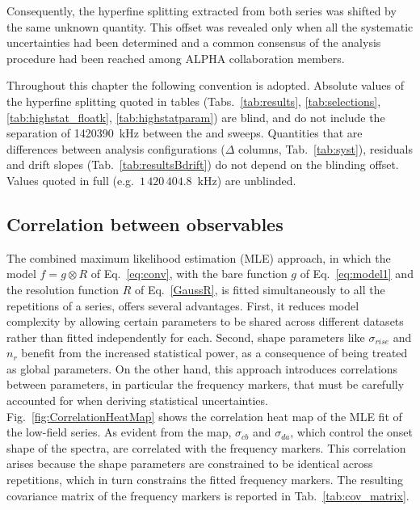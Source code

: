 Consequently, the hyperfine splitting extracted from both series was shifted by the same unknown quantity. This offset was revealed only when all the systematic uncertainties had been determined and a common consensus of the analysis procedure had been reached among ALPHA collaboration members.

Throughout this chapter the following convention is adopted. Absolute values of the hyperfine splitting quoted in tables (Tabs.~\ref{tab:results}, \ref{tab:selections}, \ref{tab:highstat_floatk}, \ref{tab:highstatparam}) are blind, and do not include the separation of \SI{1420390}{\kilo\hertz} between the \cb and \da sweeps. Quantities that are differences between analysis configurations ($\Delta$ columns, Tab.~\ref{tab:syst}), residuals and drift slopes (Tab.~\ref{tab:resultsBdrift}) do not depend on the blinding offset. Values quoted in full (e.g.\ $1\,420\,404.8$~kHz) are unblinded.

\subsection{Correlation between observables} \label{sec:Correlation}

The combined maximum likelihood estimation (MLE) approach, in which the model $f = g \otimes R$ of Eq.~\ref{eq:conv}, with the bare function $g$ of Eq.~\ref{eq:model1} and the resolution function $R$ of Eq.~\ref{GaussR}, is fitted simultaneously to all the repetitions of a series, offers several advantages. First, it reduces model complexity by allowing certain parameters to be shared across different datasets rather than fitted independently for each. Second, shape parameters like $\sigma_{rise}$ and $n_r$ benefit from the increased statistical power, as a consequence of being treated as global parameters. On the other hand, this approach introduces correlations between parameters, in particular the frequency markers, that must be carefully accounted for when deriving statistical uncertainties. Fig.~\ref{fig:CorrelationHeatMap} shows the correlation heat map of the MLE fit of the low-field series. As evident from the map, $\sigma_{cb}$ and $\sigma_{da}$, which control the onset shape of the spectra, are correlated with the frequency markers. This correlation arises because the shape parameters are constrained to be identical across repetitions, which in turn constrains the fitted frequency markers. The resulting covariance matrix of the frequency markers is reported in Tab.~\ref{tab:cov_matrix}.

